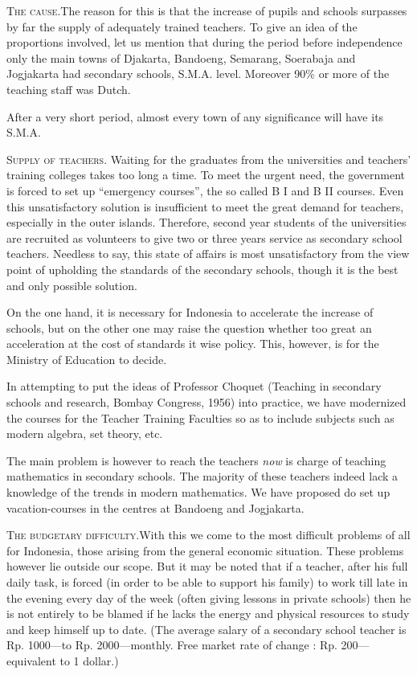 \noindent
\textsc{The cause.}\pageoriginale The reason for this is that the
increase of pupils and schools surpasses by far the supply of
adequately trained teachers. To give an idea of the proportions
involved, let us mention that during the period before independence
only the main towns of Djakarta, Bandoeng, Semarang, Soerabaja and
Jogjakarta had secondary schools, S.M.A. level. Moreover 90\% or more
of the teaching staff was Dutch.

After a very short period, almost every town of any significance will
have its S.M.A.

\noindent
\textsc{Supply of teachers.} Waiting for the graduates from the
universities and teachers' training colleges takes too long a time. To
meet the urgent need, the government is forced to set up ``emergency
courses'', the so called B I and B II courses. Even this
unsatisfactory solution is  insufficient to meet the great demand for
teachers, especially in the outer islands. Therefore, second year
students of the universities are recruited as volunteers to give two
or three years service as secondary school teachers. Needless to say,
this state of affairs is most unsatisfactory from the view point of
upholding the standards of the secondary schools, though it is the
best and only possible solution.

On the one hand, it is necessary for Indonesia to accelerate the
increase of schools, but on the other one may raise the question
whether too great an acceleration at the cost of standards it wise
policy. This, however, is for the Ministry of Education to decide.

In attempting to put the ideas of Professor Choquet (Teaching in
secondary schools and research, Bombay Congress, 1956) into practice,
we have modernized the courses for the Teacher Training Faculties so
as to include subjects such as modern algebra, set theory, etc.

The main problem is however to reach the teachers \textit{now} is
charge of teaching mathematics in secondary schools. The majority of
these teachers indeed lack a knowledge of the trends in modern
mathematics. We have proposed do set up vacation-courses in the
centres at Bandoeng and Jogjakarta.

\medskip
\noindent
\textsc{The budgetary difficulty.}\pageoriginale With this we come to
the most difficult problems of all for Indonesia, those arising from
the general economic situation. These problems however lie outside
our scope. But it may be noted that if a teacher, after his full daily
task, is forced (in order to be able to support his family) to work
till late in the evening every day of the week (often giving lessons
in private schools) then he is not entirely to be blamed if he lacks
the energy and physical resources to study and keep himself up to
date. (The average salary of a secondary school teacher is
Rp. 1000---to Rp. 2000---monthly. Free market rate of change :
Rp. 200---equivalent to 1 dollar.)

